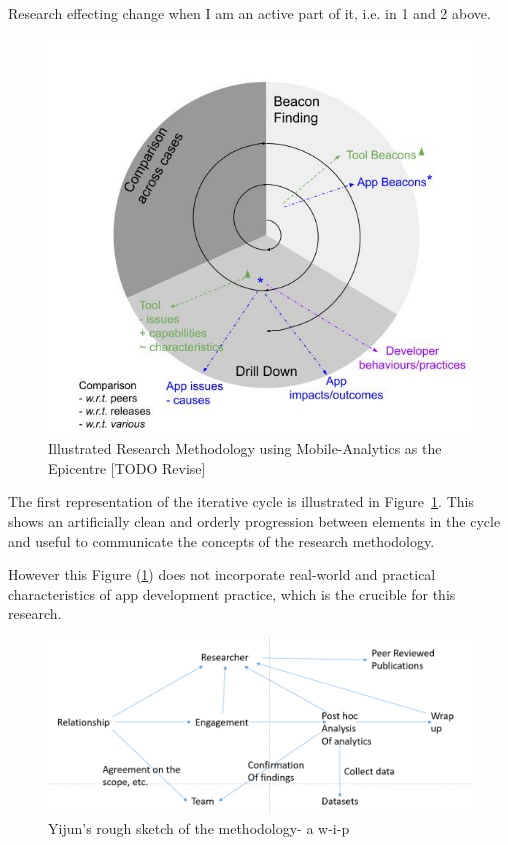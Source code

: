 Research effecting change when I am an active part of it, i.e. in 1 and 2 above.




\begin{figure}
    \centering
    \includegraphics[width=14cm]{images/my/Illustrated-Research-Methodology-using-Mobile-Analytics-as-the-Epicentre-v0-2.jpeg}
    \caption{Illustrated Research Methodology using Mobile-Analytics as the Epicentre [TODO Revise]}
    \label{fig:Illustrated-Research-Methodology-using-Mobile-Analytics-as-the-Epicentre}
\end{figure}

The first representation of the iterative cycle is illustrated in Figure~\ref{fig:Illustrated-Research-Methodology-using-Mobile-Analytics-as-the-Epicentre}. This shows an artificially clean and orderly progression between elements in the cycle and useful to communicate the concepts of the research methodology. 

However this Figure (\ref{fig:Illustrated-Research-Methodology-using-Mobile-Analytics-as-the-Epicentre}) does not incorporate real-world and practical characteristics of app development practice, which is the crucible for this research.


\begin{figure}
    \centering
    \includegraphics[width=14cm]{images/rough-sketches/Yijun-rough-sketch-of-relationships-in-case-study-methodology.png}
    \caption{Yijun's rough sketch of the methodology- a w-i-p}
    \label{fig:yijun-methodology-sketch}
\end{figure}

